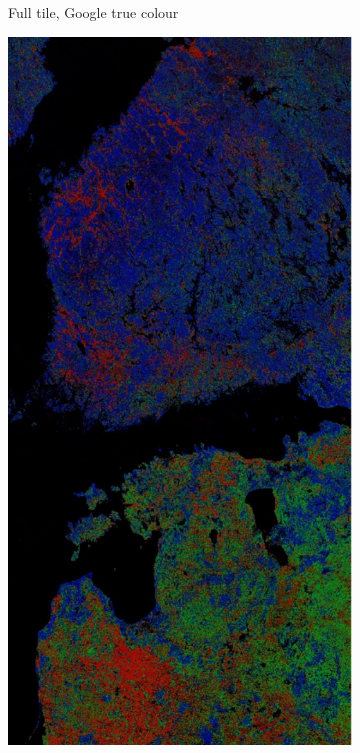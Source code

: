 \documentclass[a4paper,12pt]{scrbook}
\begin{document}
\begin{figure}
\begin{subfigure}[t]{.23\textwidth}
    \caption{Full tile, Google true colour}
  \end{subfigure} \hfill
  \begin{subfigure}[t]{.23\textwidth}
    \includegraphics[width=\textwidth]{thesis-figures/figures-qgis/fulltile-rf}

\end{subfigure}
\end{figure}
\end{document}
